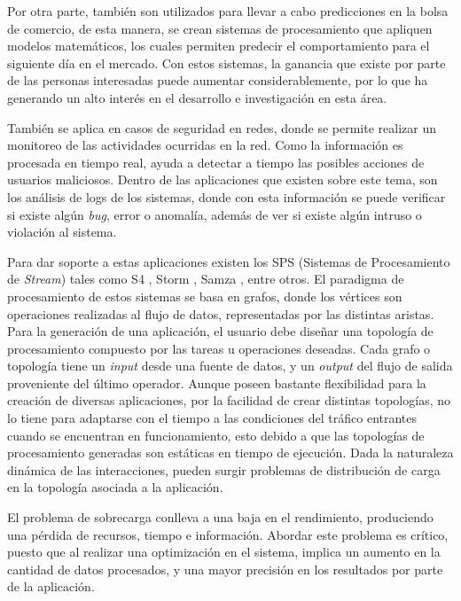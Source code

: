 Por otra parte, también son utilizados para llevar a cabo predicciones en la bolsa de comercio, de esta manera, se crean sistemas de procesamiento que apliquen modelos matemáticos, los cuales permiten predecir el comportamiento para el siguiente día en el mercado. Con estos sistemas, la ganancia que existe por parte de las personas interesadas puede aumentar considerablemente, por lo que ha generando un alto interés en el desarrollo e investigación en esta área.

También se aplica en casos de seguridad en redes, donde se permite realizar un monitoreo de las actividades ocurridas en la red. Como la información es procesada en tiempo real, ayuda a detectar a tiempo las posibles acciones de usuarios maliciosos. Dentro de las aplicaciones que existen sobre este tema, son los análisis de logs de los sistemas, donde con esta información se puede verificar si existe algún \textit{bug}, error o anomalía, además de ver si existe algún intruso o violación al sistema.

Para dar soporte a estas aplicaciones existen los SPS (Sistemas de Procesamiento de \textit{Stream}) tales como S4 \citep{s4yahoo}, Storm \citep{stormtwitter}, Samza \citep{samza}, entre otros. El paradigma de procesamiento de estos sistemas se basa en grafos, donde los vértices son operaciones realizadas al flujo de datos, representadas por las distintas aristas. Para la generación de una aplicación, el usuario debe diseñar una topología de procesamiento compuesto por las tareas u operaciones deseadas. Cada grafo o topología tiene un \textit{input} desde una fuente de datos, y un \textit{output} del flujo de salida proveniente del último operador. Aunque poseen bastante flexibilidad para la creación de diversas aplicaciones, por la facilidad de crear distintas topologías, no lo tiene para adaptarse con el tiempo a las condiciones del tráfico entrantes cuando se encuentran en funcionamiento, esto debido a que las topolog\'ias de procesamiento generadas son est\'aticas en tiempo de ejecución. Dada la naturaleza din\'amica de las interacciones, pueden surgir problemas de distribución de carga en la topología asociada a la aplicación.

El problema de sobrecarga conlleva a una baja en el rendimiento, produciendo una pérdida de recursos, tiempo e información. Abordar este problema es crítico, puesto que al realizar una optimización en el sistema, implica un aumento en la cantidad de datos procesados, y una mayor precisión en los resultados por parte de la aplicación.

